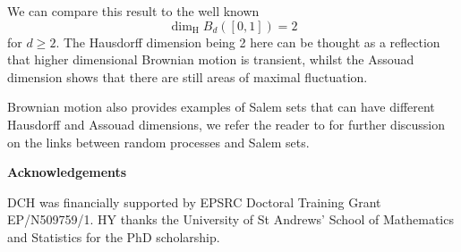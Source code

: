 \documentclass{amsart}
\begin{document}
We can compare this result to the well known \[\dim_{\mathrm{H}} B_d([0,1])=2\] for $d\geq 2$. The Hausdorff dimension being 2 here can be thought as a reflection that higher dimensional Brownian motion is transient, whilst the Assouad dimension shows that there are still areas of maximal fluctuation. 

 Brownian motion also provides examples of Salem sets that can have different Hausdorff and Assouad dimensions, we refer the reader to \cite{Ka}  for further discussion on the links between random processes and Salem sets.


\begin{centering}

\textbf{Acknowledgements}

\end{centering}

DCH was financially supported by EPSRC Doctoral Training Grant EP/N509759/1. HY thanks the University of St Andrews' School of Mathematics and Statistics for the PhD scholarship.
\end{document}
